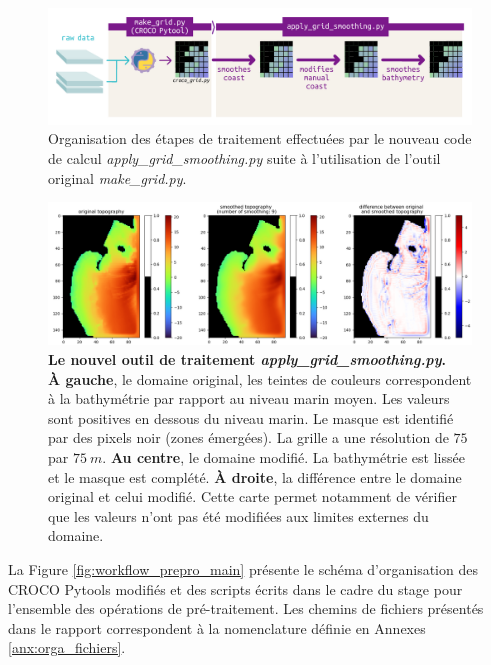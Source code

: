 \documentclass[10pt,a4paper,titlepage]{article}
\begin{document}
\begin{figure}[H]
    \centering
    \includegraphics[scale=0.7]{../images/workflow/grid_smoothing.pdf}
    \caption{Organisation des étapes de traitement effectuées par le nouveau code de calcul \textit{apply\_grid\_smoothing.py} suite à l'utilisation de l'outil original \textit{make\_grid.py}.}
    \label{fig:new_smooth_work}

\end{figure}
\begin{figure}[H]
    \centering
    \includegraphics[scale=0.35]{../images/grid_smoothing_adcl5_9.png}
    \caption{
        \textbf{Le nouvel outil de traitement \textit{apply\_grid\_smoothing.py}.}\\
        \textbf{À gauche}, le domaine original, les teintes de couleurs correspondent à la bathymétrie par rapport au niveau marin moyen.
        Les valeurs sont positives en dessous du niveau marin.
        Le masque est identifié par des pixels noir (zones émergées).
        La grille a une résolution de $75$ par $75~m$.
        \textbf{Au centre}, le domaine modifié.
        La bathymétrie est lissée et le masque est complété.
        \textbf{À droite}, la différence entre le domaine original et celui modifié.
        Cette carte permet notamment de vérifier que les valeurs n'ont pas été modifiées aux limites externes du domaine.
    }
    \label{fig:new_smooth}
\end{figure}

La Figure \ref{fig:workflow_prepro_main} présente le schéma d'organisation des CROCO Pytools modifiés et des scripts écrits dans le cadre du stage pour l'ensemble des opérations de pré-traitement.
Les chemins de fichiers présentés dans le rapport correspondent à la nomenclature définie en Annexes \ref{anx:orga_fichiers}.
\end{document}
